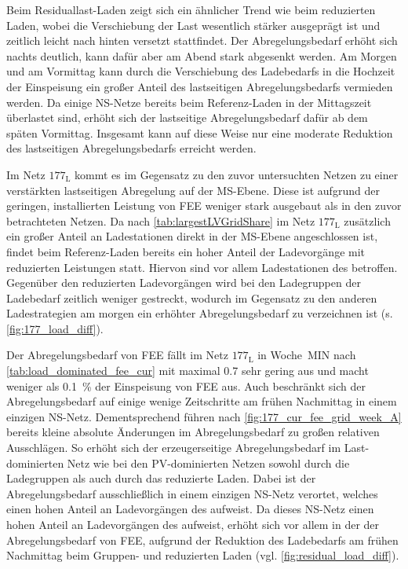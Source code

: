 

Beim Residuallast-Laden zeigt sich ein ähnlicher Trend wie beim reduzierten Laden, wobei die Verschiebung der Last wesentlich stärker ausgeprägt ist und zeitlich leicht nach hinten versetzt stattfindet.
Der Abregelungsbedarf erhöht sich nachts deutlich, kann dafür aber am Abend stark abgesenkt werden.
Am Morgen und am Vormittag kann durch die Verschiebung des Ladebedarfs in die Hochzeit der Einspeisung ein großer Anteil des lastseitigen Abregelungsbedarfs vermieden werden.
Da einige \gls{NS}-Netze bereits beim Referenz-Laden in der Mittagszeit überlastet sind, erhöht sich der lastseitige Abregelungsbedarf dafür ab dem späten Vormittag.
Insgesamt kann auf diese Weise nur eine moderate Reduktion des lastseitigen Abregelungsbedarfs erreicht werden.\medskip

Im Netz \(177_{\text{L}}\) kommt es im Gegensatz zu den zuvor untersuchten Netzen zu einer verstärkten lastseitigen Abregelung auf der \gls{MS}-Ebene.
Diese ist aufgrund der geringen, installierten Leistung von \gls{FEE} weniger stark ausgebaut als in den zuvor betrachteten Netzen.
Da nach \autoref{tab:largestLVGridShare} im Netz \(177_{\text{L}}\) zusätzlich ein großer Anteil an Ladestationen direkt in der \gls{MS}-Ebene angeschlossen ist, findet beim Referenz-Laden bereits ein hoher Anteil der Ladevorgänge mit reduzierten Leistungen statt.
Hiervon sind vor allem Ladestationen des \UC \Firmeparkplatz betroffen.
Gegenüber den reduzierten Ladevorgängen wird bei den Ladegruppen der Ladebedarf zeitlich weniger gestreckt, wodurch im Gegensatz zu den anderen Ladestrategien am morgen ein erhöhter Abregelungsbedarf zu verzeichnen ist (s. \autoref{fig:177_load_diff}).



Der Abregelungsbedarf von \gls{FEE} fällt im Netz \(177_{\text{L}}\) in Woche~MIN nach \autoref{tab:load_dominated_fee_cur} mit maximal \SI{0.7}{\mwh} sehr gering aus und macht weniger als \SI{0.1}{\percent} der Einspeisung von \gls{FEE} aus.
Auch beschränkt sich der Abregelungsbedarf auf einige wenige Zeitschritte am frühen Nachmittag in einem einzigen \gls{NS}-Netz.
Dementsprechend führen nach \autoref{fig:177_cur_fee_grid_week_A} bereits kleine absolute Änderungen im Abregelungsbedarf zu großen relativen Ausschlägen.
So erhöht sich der erzeugerseitige Abregelungsbedarf im Last-dominierten Netz wie bei den \gls{PV}-dominierten Netzen sowohl durch die Ladegruppen als auch durch das reduzierte Laden.
Dabei ist der Abregelungsbedarf ausschließlich in einem einzigen \gls{NS}-Netz verortet, welches einen hohen Anteil an Ladevorgängen des \UC \zH aufweist.
Da dieses \gls{NS}-Netz einen hohen Anteil an Ladevorgängen des \UC \zH aufweist, erhöht sich vor allem in der \SzeFirmenparkplatz der Abregelungsbedarf von \gls{FEE}, aufgrund der Reduktion des Ladebedarfs am frühen Nachmittag beim Gruppen- und reduzierten Laden (vgl. \autoref{fig:residual_load_diff}).

